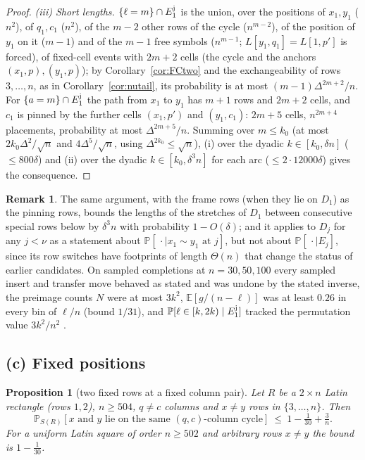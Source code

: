 \documentclass[11pt]{article}
\newtheorem{proposition}[theorem]{Proposition}
\theoremstyle{definition}
\newtheorem{remark}[theorem]{Remark}
\renewcommand{\Pr}{\mathbb{P}}
\begin{document}
\begin{proof}
\emph{(iii) Short lengths.}  $\{\ell=m\}\cap E_1^{\rm j}$ is the union, over the positions
of $x_1,y_1$ ($n^2$), of $q_1,c_1$ ($n^2$), of the $m-2$ other rows of the cycle
($n^{m-2}$), of the position of $y_1$ on it ($m-1$) and of the $m-1$ free symbols
($n^{m-1}$; $L[y_1,q_1]=L[1,p']$ is forced), of fixed-cell events with $2m+2$ cells (the
cycle and the anchors $(x_1,p),(y_1,p)$); by Corollary~\ref{cor:FCtwo} and the
exchangeability of rows $3,\dots,n$, as in Corollary~\ref{cor:nutail}, its probability is
at most $(m-1)\Delta^{2m+2}/n$.  For $\{a=m\}\cap E_1^{\rm j}$ the path from $x_1$ to $y_1$
has $m+1$ rows and $2m+2$ cells, and $c_1$ is pinned by the further cells $(x_1,p')$ and
$(y_1,c_1)$: $2m+5$ cells, $n^{2m+4}$ placements, probability at most $\Delta^{2m+5}/n$.
Summing over $m\le k_0$ (at most $2k_0\Delta^2/\sqrt n$ and $4\Delta^5/\sqrt n$, using
$\Delta^{2k_0}\le\sqrt n$), (i) over the dyadic $k\in[k_0,\delta n]$ ($\le800\delta$) and
(ii) over the dyadic $k\in[k_0,\delta^3n]$ for each arc ($\le2\cdot12000\delta$) gives
the consequence.
\end{proof}

\begin{remark}
The same argument, with the frame rows (when they lie on $D_1$) as the pinning rows,
bounds the lengths of the stretches of $D_1$ between consecutive special rows below by
$\delta^3n$ with
probability $1-O(\delta)$; and it applies to $D_j$ for any $j<\nu$ as a statement about
$\Pr[\,\cdot\mid x_1\sim y_1\text{ at }j]$, but not about $\Pr[\,\cdot\mid E_j]$, since its
row switches have footprints of length $\Theta(n)$ that change the status of earlier
candidates.  On sampled completions at $n=30,50,100$ every sampled insert and transfer
move behaved as stated and was undone by the stated inverse, the preimage counts $N$ were
at most $3k^2$, $\mathbb E[g/(n-\ell)]$ was at least $0.26$ in every bin of $\ell/n$
(bound $1/31$), and $\Pr[\ell\in[k,2k)\mid E_1^{\rm j}]$ tracked the permutation value
$3k^2/n^2$ \cite{repo}.
\end{remark}

\subsection*{(c) Fixed positions}

\begin{proposition}[two fixed rows at a fixed column pair]\label{prop:fixedpos}
Let $R$ be a $2\times n$ Latin rectangle (rows $1,2$), $n\ge504$, $q\ne c$ columns and
$x\ne y$ rows in $\{3,\dots,n\}$.  Then
\[
\Pr_{S(R)}[x\text{ and }y\text{ lie on the same }(q,c)\text{-column cycle}]\ \le\ 1-\tfrac1{30}+\tfrac3n .
\]
For a uniform Latin square of order $n\ge502$ and arbitrary rows $x\ne y$ the bound is
$1-\tfrac1{30}$.
\end{proposition}
\end{document}
